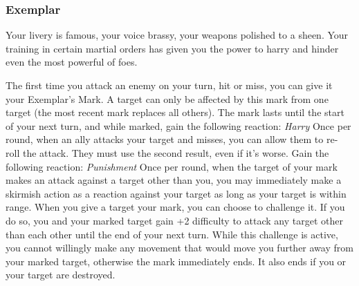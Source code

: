 \subsubsection{Exemplar}

\begin{talent}
{Your livery is famous, your voice brassy, your weapons polished to a sheen. Your training in certain martial orders has given you the power to harry and hinder even the most powerful of foes.}

The first time you attack an enemy on your turn, hit or miss, you can give it your Exemplar’s Mark. A target can only be affected by this mark from one target (the most recent mark replaces all others). 
The mark lasts until the start of your next turn, and while marked, gain the following reaction:\newline 
\textit{Harry}\newline 
\Reaction\newline 
Once per round, when an ally attacks your target and misses, you can allow them to re- roll the attack. They must use the second result, even if it’s worse.
Gain the following reaction:\newline 
\textit{Punishment\newline}
\Reaction\newline 
Once per round, when the target of your mark makes an attack against a target other than you, you may immediately make a skirmish action as a reaction against your target as long as your target is within range.
When you give a target your mark, you can choose to challenge it. If you do so, you and your marked target gain +2 difficulty to attack any target other than each other until the end of your next turn. While this challenge is active, you cannot willingly make any movement that would move you further away from your marked target, otherwise the mark immediately ends. It also ends if you or your target are destroyed.
\end{talent}